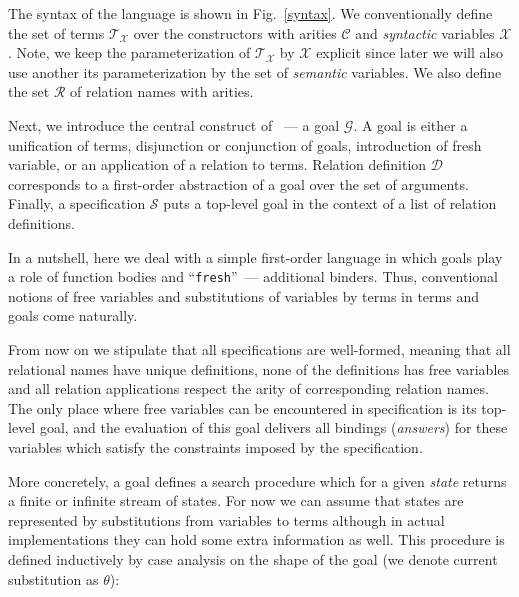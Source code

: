 The syntax of the language is shown in Fig.~\ref{syntax}. We conventionally define the set of terms $\mathcal{T}_\mathcal{X}$
over the constructors with arities $\mathcal{C}$ and \emph{syntactic} variables $\mathcal{X}$. Note, we keep the parameterization of $\mathcal{T}_\mathcal{X}$ by $\mathcal{X}$
explicit since later we will also use another its parameterization by the set of \emph{semantic} variables. We also define the set $\mathcal{R}$ of relation names with arities.

Next, we introduce the central construct of \mk~--- a goal $\mathcal{G}$. A goal is either a unification of terms, disjunction or conjunction of goals, introduction of fresh variable,
or an application of a relation to terms. Relation definition $\mathcal{D}$ corresponds to a first-order abstraction of a goal over the set of arguments. Finally, a specification $\mathcal{S}$
puts a top-level goal in the context of a list of relation definitions.

In a nutshell, here we deal with a simple first-order language in which goals play a role of function bodies and ``\lstinline|fresh|''~--- additional binders. Thus,
conventional notions of free variables and substitutions of variables by terms in terms and goals come naturally.

From now on we stipulate that all specifications are well-formed, meaning that all relational names have unique definitions, none of the definitions has
free variables and all relation applications respect the arity of corresponding relation names. The only place where free variables can be encountered in specification
is its top-level goal, and the evaluation of this goal delivers all bindings (\emph{answers}) for these variables which satisfy the constraints imposed by the specification.

More concretely, a goal defines a search procedure which for a given \emph{state} returns a finite or infinite stream of states. For now we can assume that states are represented by
substitutions from variables to terms although in actual implementations they can hold some extra information as well. This procedure is defined inductively by case analysis on the
shape of the goal (we denote current substitution as $\theta$):

